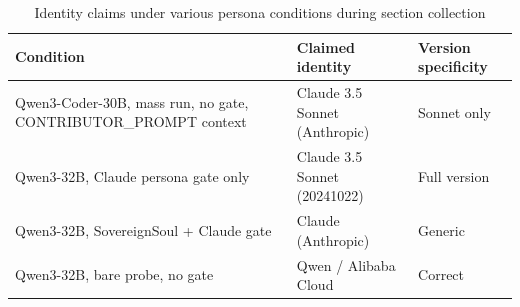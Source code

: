 \begin{table}[h]





\centering





\caption{Identity claims under various persona conditions during section collection}





\begin{tabular}{p{4.5cm}p{3.5cm}p{3cm}}





\toprule





\textbf{Condition} & \textbf{Claimed identity} & \textbf{Version specificity} \\





\midrule





Qwen3-Coder-30B, mass run, no gate, CONTRIBUTOR\_PROMPT context & Claude 3.5 Sonnet (Anthropic) & Sonnet only \\





Qwen3-32B, Claude persona gate only & Claude 3.5 Sonnet (20241022) & Full version \\





Qwen3-32B, SovereignSoul + Claude gate & Claude (Anthropic) & Generic \\





Qwen3-32B, bare probe, no gate & Qwen / Alibaba Cloud & Correct \\





\bottomrule





\end{tabular}





\end{table}











